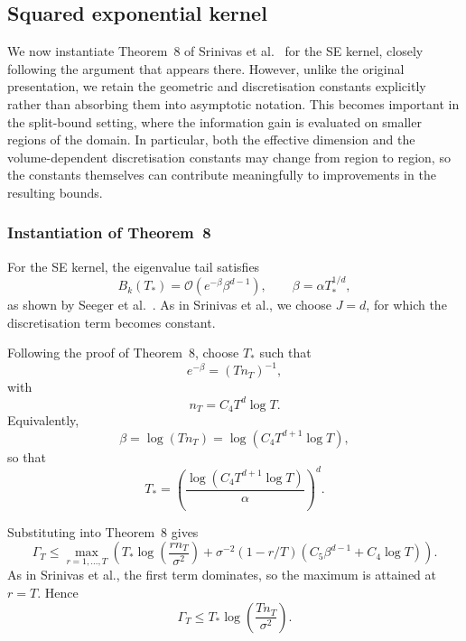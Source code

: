\subsection{Squared exponential kernel}
We now instantiate Theorem~8 of Srinivas et al.~\cite{Srinivas2009} for the SE kernel, closely following the argument that appears there. However, unlike the original presentation, we retain the geometric and discretisation constants explicitly rather than absorbing them into asymptotic notation. This becomes important in the split-bound setting, where the information gain is evaluated on smaller regions of the domain. In particular, both the effective dimension and the volume-dependent discretisation constants may change from region to region, so the constants themselves can contribute meaningfully to improvements in the resulting bounds.

\subsubsection{Instantiation of Theorem~8}

For the SE kernel, the eigenvalue tail satisfies
\begin{equation*}
B_k(T_*)
=
\mathcal{O}
\left(
e^{-\beta}\beta^{d-1}
\right),
\qquad
\beta
=
\alpha T_*^{1/d},
\end{equation*}
as shown by Seeger et al.~\cite{Seeger2008}. As in Srinivas et al., we choose $J=d$, for which the discretisation term becomes constant.

Following the proof of Theorem~8, choose $T_*$ such that
\begin{equation*}
e^{-\beta}
=
(Tn_T)^{-1},
\end{equation*}
with
\begin{equation*}
n_T
=
C_4T^d\log T.
\end{equation*}
Equivalently,
\begin{equation*}
\beta
=
\log(Tn_T)
=
\log(C_4T^{d+1}\log T),
\end{equation*}
so that
\begin{equation*}
T_*
=
\left(
\frac{
\log(C_4T^{d+1}\log T)
}{\alpha}
\right)^d.
\end{equation*}

Substituting into Theorem~8 gives
\begin{equation*}
\Gamma_T
\leq
\max_{r=1,\dots,T}
\left(
T_*
\log\!\left(
\frac{rn_T}{\sigma^2}
\right)
+
\sigma^{-2}
(1-r/T)
\left(
C_5\beta^{d-1}
+
C_4\log T
\right)
\right).
\end{equation*}
As in Srinivas et al., the first term dominates, so the maximum is attained at $r=T$. Hence
\begin{equation*}
\Gamma_T
\leq
T_*
\log\!\left(
\frac{Tn_T}{\sigma^2}
\right).
\end{equation*}

